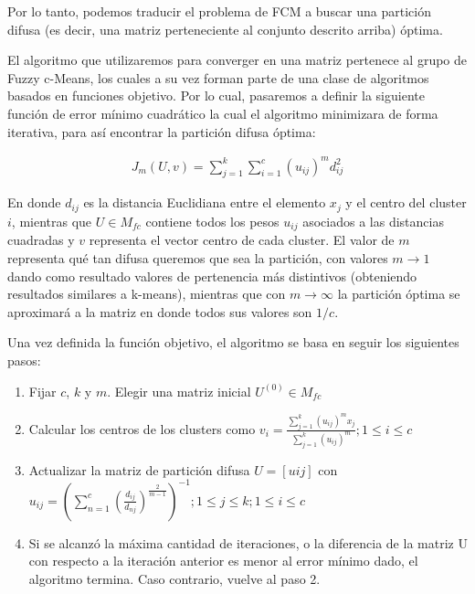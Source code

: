 Por lo tanto, podemos traducir el problema de \gls{FCM} a buscar una partición difusa (es decir, una matriz perteneciente al conjunto descrito arriba) óptima.

El algoritmo que utilizaremos para converger en una matriz pertenece al grupo de Fuzzy c-Means, los cuales a su vez forman parte de una clase de algoritmos basados en funciones objetivo. Por lo cual, pasaremos a definir la siguiente función de error mínimo cuadrático la cual el algoritmo minimizara de forma iterativa, para así encontrar la partición difusa óptima:

\begin{equation}
    \begin{aligned}
        J_m(U, v) = \sum_{j=1}^{k} \sum_{i=1}^{c} (u_{ij})^m d_{ij}^2
    \end{aligned}
\end{equation} 

En donde $d_{ij}$ es la distancia Euclidiana entre el elemento $x_j$ y el centro del cluster $i$, mientras que $U \in M_{fc}$ contiene todos los pesos $u_{ij}$ asociados a las distancias cuadradas y $v$ representa el vector centro de cada cluster. El valor de $m$ representa qué tan difusa queremos que sea la partición, con valores  $m \rightarrow 1$ dando como resultado valores de pertenencia más distintivos (obteniendo resultados similares a k-means), mientras que con $m \rightarrow \infty$ la partición óptima se aproximará a la matriz en donde todos sus valores son $1/c$.

Una vez definida la función objetivo, el algoritmo se basa en seguir los siguientes pasos:
\begin{enumerate}
  \item Fijar $c$, $k$ y $m$. Elegir una matriz inicial $U^{(0)}\in M_{fc}$
  \item Calcular los centros de los clusters como $v_{i}={\frac {\sum \limits _{j=1}^{k}(u_{ij})^{m}x_{j}}{\sum \limits _{j=1}^{k}(u_{ij})^{m}}};1\leq i\leq c$
  \item Actualizar la matriz de partición difusa $U = [uij]$ con $u_{ij}=(\sum \limits _{n=1}^{c}({\frac {d_{ij}}{d_{nj}}})^{\frac {2}{m-1}})^{-1};1\leq j\leq k;1\leq i\leq c$
  \item Si se alcanzó la máxima cantidad de iteraciones, o la diferencia de la matriz U con respecto a la iteración anterior es menor al error mínimo dado, el algoritmo termina. Caso contrario, vuelve al paso 2.
\end{enumerate}

